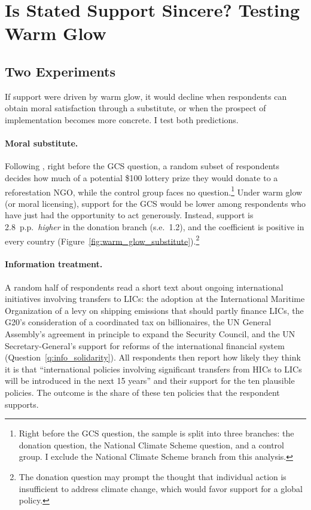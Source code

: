 \documentclass[12pt,english]{article}
\begin{document}
\section{Is Stated Support Sincere? Testing Warm Glow}\label{sec:sincerity}

\subsection{Two Experiments}\label{subsec:warm_glow}

If support were driven by warm glow, it would decline when respondents can obtain moral satisfaction through a substitute, or when the prospect of implementation becomes more concrete. I test both predictions.

\paragraph{Moral substitute.} Following \cite{nunes_identifying_2003}, right before the GCS question, a random subset of respondents decides how much of a potential \$100 lottery prize they would donate to a reforestation NGO, while the control group faces no question.\footnote{Right before the GCS question, the sample is split into three branches: the donation question, the National Climate Scheme question, and a control group. I exclude the National Climate Scheme branch from this analysis.} Under warm glow (or moral licensing), support for the GCS would be lower among respondents who have just had the opportunity to act generously. Instead, support is 2.8~p.p.\ \textit{higher} in the donation branch (s.e.\ 1.2), and the coefficient is positive in every country (Figure~\ref{fig:warm_glow_substitute}).\footnote{The donation question may prompt the thought that individual action is insufficient to address climate change, which would favor support for a global policy.}

\paragraph{Information treatment.} A random half of respondents read a short text about ongoing international initiatives involving transfers to LICs: the adoption at the International Maritime Organization of a levy on shipping emissions that should partly finance LICs, the G20's consideration of a coordinated tax on billionaires, the UN General Assembly's agreement in principle to expand the Security Council, and the UN Secretary-General's support for reforms of the international financial system (Question~\ref{q:info_solidarity}). All respondents then report how likely they think it is that ``international policies involving significant transfers from HICs to LICs will be introduced in the next 15 years'' and their support for the ten plausible policies. The outcome is the share of these ten policies that the respondent supports.
\end{document}
